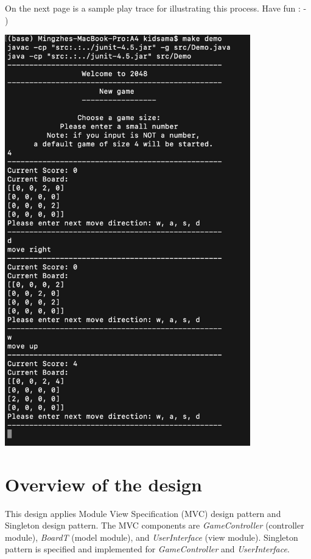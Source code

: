 \documentclass[12pt]{article}
\begin{document}
\noindent
On the next page is a sample play trace for illustrating this process. Have fun : - )
\begin{center}
  \includegraphics[width=0.8\textwidth]{hwp.png}
\end{center}


\newpage
\section*{Overview of the design}

This design applies Module View Specification (MVC) design pattern and Singleton design pattern. The MVC components are \textit{GameController} (controller module), \textit{BoardT} (model module), and \textit{UserInterface} (view module). Singleton pattern is specified and implemented for \textit{GameController} and \textit{UserInterface}.

\bigskip

\end{document}
